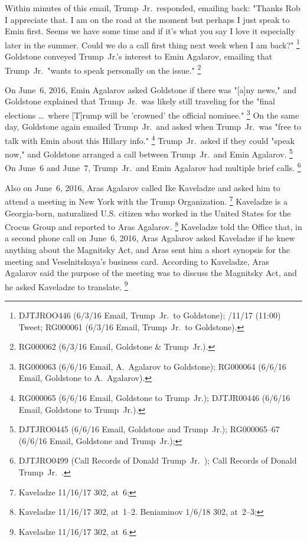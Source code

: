 Within minutes of this email, Trump~Jr.\ responded, emailing back: "Thanks Rob I appreciate that.
I am on the road at the moment but perhaps I just speak to Emin first.
Seems we have some time and if it's what you say I love it especially later in the summer.
Could we do a call first thing next week when I am back?"%
\footnote{DJTJROO446 (6/3/16 Email, Trump~Jr.\ to Goldstone);
/11/17 (11:00) Tweet;
RG000061 (6/3/16 Email, Trump~Jr.\ to Goldstone).}
Goldstone conveyed Trump~Jr.'s interest to Emin Agalarov, emailing that Trump~Jr.\ "wants to speak personally on the issue."%
\footnote{ RG000062 (6/3/16 Email, Goldstone \& Trump~Jr.).}

On June~6, 2016, Emin Agalarov asked Goldstone if there was "[a]ny news," and Goldstone explained that Trump~Jr.\ was likely still traveling for the "final elections \dots\ where [T]rump will be 'crowned' the official nominee."%
\footnote{RG000063 (6/6/16 Email, A.~Agalarov to Goldstone);
RG000064 (6/6/16 Email, Goldstone to A.~Agalarov).}
On the same day, Goldstone again emailed Trump~Jr.\ and asked when Trump~Jr.\ was "free to talk with Emin about this Hillary info."%
\footnote{RG000065 (6/6/16 Email, Goldstone to Trump~Jr.);
DJTJR00446 (6/6/16 Email, Goldstone to Trump~Jr.).}
Trump~Jr.\ asked if they could "speak now," and Goldstone arranged a call between Trump~Jr.\ and Emin Agalarov.%
\footnote{DJTJRO0445 (6/6/16 Email, Goldstone and Trump~Jr.);
RG000065--67 (6/6/16 Email, Goldstone and Trump~Jr.);
}
On June~6 and June~7, Trump~Jr.\ and Emin Agalarov had multiple brief calls.%
\footnote{DJTJRO0499 (Call Records of Donald Trump~Jr.\ );
Call Records of Donald Trump~Jr.\ .}

Also on June~6, 2016, Aras Agalarov called Ike Kaveladze and asked him to attend a meeting in New York with the Trump Organization.%
\footnote{Kaveladze 11/16/17 302, at~6; }
Kaveladze is a Georgia-born, naturalized U.S. citizen who worked in the United States for the Crocus Group and reported to Aras Agalarov.%
\footnote{Kaveladze 11/16/17 302, at~1--2.
 Beniaminov 1/6/18 302, at~2--3;
}
Kaveladze told the Office that, in a second phone call on June~6, 2016, Aras Agalarov asked Kaveladze if he knew anything about the Magnitsky Act, and Aras sent him a short synopsis for the meeting and Veselnitskaya's business card.
According to Kaveladze, Aras Agalarov said the purpose of the meeting was to discuss the Magnitsky Act, and he asked Kaveladze to translate.%
\footnote{Kaveladze 11/16/17 302, at~6.}


